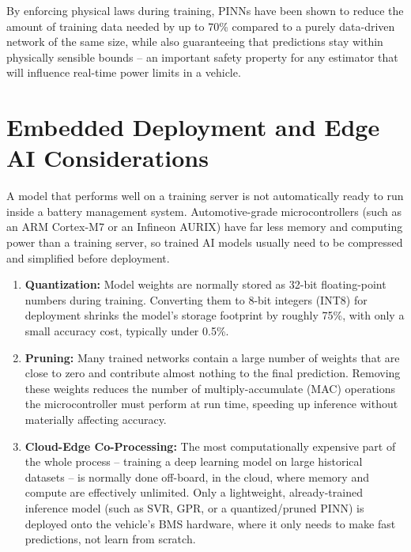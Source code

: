 By enforcing physical laws during training, PINNs have been shown to reduce the amount of training data needed by up to 70\% compared to a purely data-driven network of the same size, while also guaranteeing that predictions stay within physically sensible bounds -- an important safety property for any estimator that will influence real-time power limits in a vehicle.


\section{Embedded Deployment and Edge AI Considerations}
\label{sec:edge_ai}

A model that performs well on a training server is not automatically ready to run inside a battery management system. Automotive-grade microcontrollers (such as an ARM Cortex-M7 or an Infineon AURIX) have far less memory and computing power than a training server, so trained AI models usually need to be compressed and simplified before deployment.

\begin{enumerate}
    \item \textbf{Quantization:} Model weights are normally stored as 32-bit floating-point numbers during training. Converting them to 8-bit integers (INT8) for deployment shrinks the model's storage footprint by roughly 75\%, with only a small accuracy cost, typically under 0.5\%.
    \item \textbf{Pruning:} Many trained networks contain a large number of weights that are close to zero and contribute almost nothing to the final prediction. Removing these weights reduces the number of multiply-accumulate (MAC) operations the microcontroller must perform at run time, speeding up inference without materially affecting accuracy.
    \item \textbf{Cloud-Edge Co-Processing:} The most computationally expensive part of the whole process -- training a deep learning model on large historical datasets -- is normally done off-board, in the cloud, where memory and compute are effectively unlimited. Only a lightweight, already-trained inference model (such as SVR, GPR, or a quantized/pruned PINN) is deployed onto the vehicle's BMS hardware, where it only needs to make fast predictions, not learn from scratch.
\end{enumerate}

